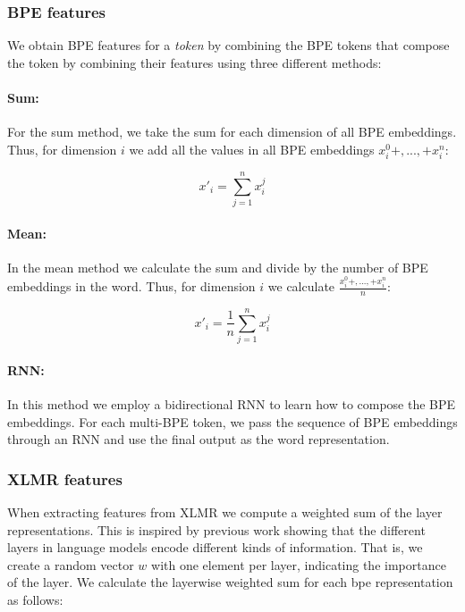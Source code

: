 \documentclass[11pt]{article}
\begin{document}
	\subsubsection{BPE features} 	
	
	We obtain BPE features for a \textit{token} by combining the BPE tokens that compose the token by combining their features using three different methods:
	
	\paragraph{Sum:} For the sum method, we take the sum for each dimension of all BPE embeddings. Thus, for dimension $i$ we add all the values in all BPE embeddings $x_i^0 + ,..., + x_i^n$:
	
	\begin{equation}
	x'_{i} = \sum_{j=1}^{n} x_i^j
	\end{equation}
	
	
	\paragraph{Mean:} In the mean method we calculate the sum and divide by the number of BPE embeddings in the word. Thus, for dimension $i$ we calculate $\frac{x_i^0 + ,..., + x_i^n}{n}$: 
	
	\begin{equation}
	x'_{i} = \frac{1}{n}\sum_{j=1}^{n} x_i^j
	\end{equation}
	
	
	\paragraph{RNN:} In this method we employ a bidirectional RNN to learn how to compose the BPE embeddings. For each multi-BPE token, we pass the sequence of BPE embeddings through an RNN and use the final output as the word representation.
	
	\subsubsection{XLMR features}
	
	When extracting features from XLMR we compute a weighted sum of the layer representations. This is inspired by previous work showing that the different layers in language models encode different kinds of information. That is, we create a random vector $w$ with one element per layer, indicating the importance of the layer. We calculate the layerwise weighted sum for each bpe representation as follows:
	
\end{document}
